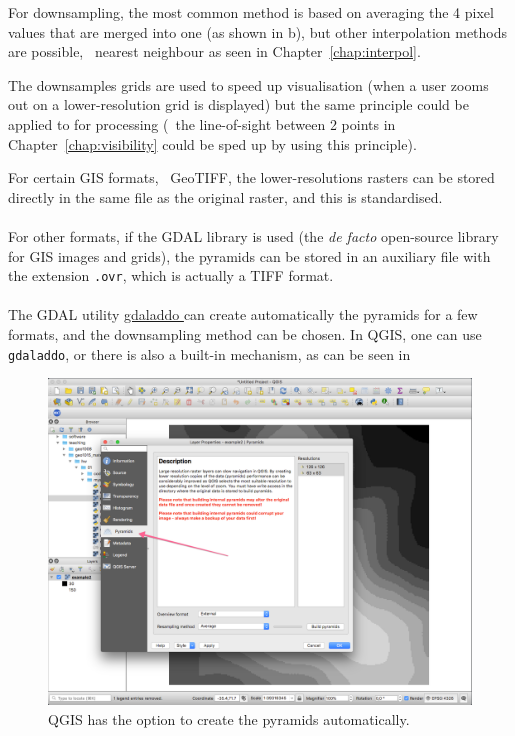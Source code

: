 %

For downsampling, the most common method is based on averaging the 4 pixel values that are merged into one (as shown in b), but other interpolation methods are possible, \eg\ nearest neighbour as seen in Chapter~\ref{chap:interpol}.

%

The downsamples grids are used to speed up visualisation (when a user zooms out on a lower-resolution grid is displayed) but the same principle could be applied to for processing (\eg\ the line-of-sight between 2 points in Chapter~\ref{chap:visibility} could be sped up by using this principle).

\begin{floatbox}
\begin{kaobox-practice}[frametitle=\faCog\ How does it work in practice?]
  For certain GIS formats, \eg\ GeoTIFF, the lower-resolutions rasters can be stored directly in the same file as the original raster, and this is standardised.
  \\ \\
  For other formats, if the GDAL library is used (the \emph{de facto} open-source library for GIS images and grids), the pyramids can be stored in an auxiliary file with the extension \texttt{.ovr}, which is actually a TIFF format.
  \\ \\
  The GDAL utility \href{https://www.gdal.org/gdaladdo.html}{gdaladdo \faExternalLink} can create automatically the pyramids for a few formats, and the downsampling method can be chosen.
  In QGIS, one can use \texttt{gdaladdo}, or there is also a built-in mechanism, as can be seen in 
\end{kaobox-practice}
\end{floatbox}

\begin{figure}
  \centering
  \includegraphics[width=\linewidth]{figs/qgis}
  \caption{QGIS has the option to create the pyramids automatically.}%
%
\end{figure}



